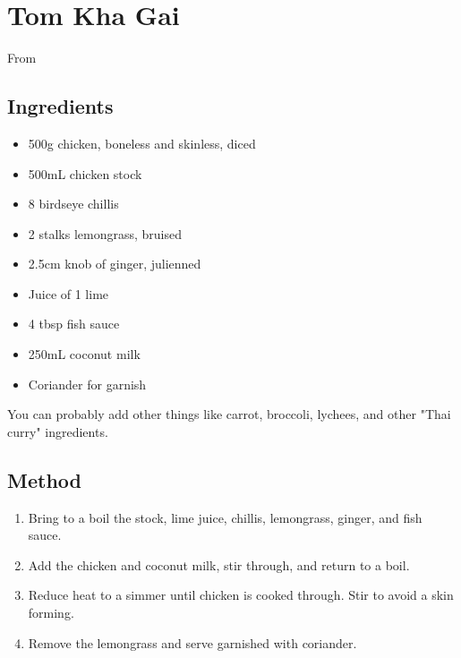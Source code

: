 \clearpage
\section{Tom Kha Gai}

From 


\subsection{Ingredients}

\begin{itemize}
        \item 500g chicken, boneless and skinless, diced
	\item 500mL chicken stock
	\item 8 birdseye chillis
	\item 2 stalks lemongrass, bruised
	\item 2.5cm knob of ginger, julienned
	\item Juice of 1 lime
	\item 4 tbsp fish sauce
	\item 250mL coconut milk
	\item Coriander for garnish
\end{itemize}

You can probably add other things like carrot, broccoli, lychees, and other "Thai curry" ingredients.

\subsection{Method}

\begin{enumerate}
	\item Bring to a boil the stock, lime juice, chillis, lemongrass, ginger, and fish sauce.
	\item Add the chicken and coconut milk, stir through, and return to a boil.
	\item Reduce heat to a simmer until chicken is cooked through. Stir to avoid a skin forming.
	\item Remove the lemongrass and serve garnished with coriander.
\end{enumerate}
